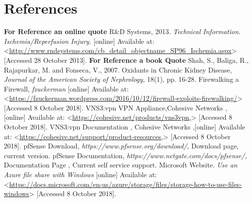 \documentclass[12pt]{report}
\begin{document}
\newpage
\section*{References}
\textbf{For Reference an online quote}
\newline
R\&D Systems, 2013. \textit{Technical Information. Ischemia/Reperfusion Injury.} [online] Available at: <\url{http://www.rndsystems.com/cb_detail_objectname_SP96_Ischemia.aspx}> [Accessed 28 October 2013].
\newline
\newline
\textbf{For Reference a book Quote}
\newline
Shah, S., Baliga, R., Rajapurkar, M. and Fonseca, V., 2007. Oxidants in Chronic Kidney Disease, \textit{Journal of the American Society of Nephrology,} 18(1), pp. 16-28.
\newline
\newline
Firewalking a Firewall, \textit{fzuckerman} [online] Available at: <\url{https://fzuckerman.wordpress.com/2016/10/12/firewall-exploits-firewalking/}> [Accessed 8 October 2018].
\newline
\newline
VNS3:vpn VPN Appliance,{Cohesive Networks} ,[online] Available at: <\url{https://cohesive.net/products/vns3vpn,}> [Accessed 8 October 2018].
\newline
\newline
VNS3:vpn Documentation , {Cohesive Networks} ,[online] Available at: <\url{https://cohesive.net/support/product-resources,}> [Accessed 8 October 2018].
\newline
\newline
pfSense Download, \textit{https://www.pfsense.org/download/,} Download page, current version.
\newline
\newline
pfSense Documentation, \textit{https://www.netgate.com/docs/pfsense/,} Documentation Page , Current self service support.
\newline
\newline
Microsoft Website. \textit{Use an Azure file share with Windows} [online] Available at: <\url{https://docs.microsoft.com/en-us/azure/storage/files/storage-how-to-use-files-windows}> [Accessed 8 October 2018].
\newline
\newline
\end{document}
